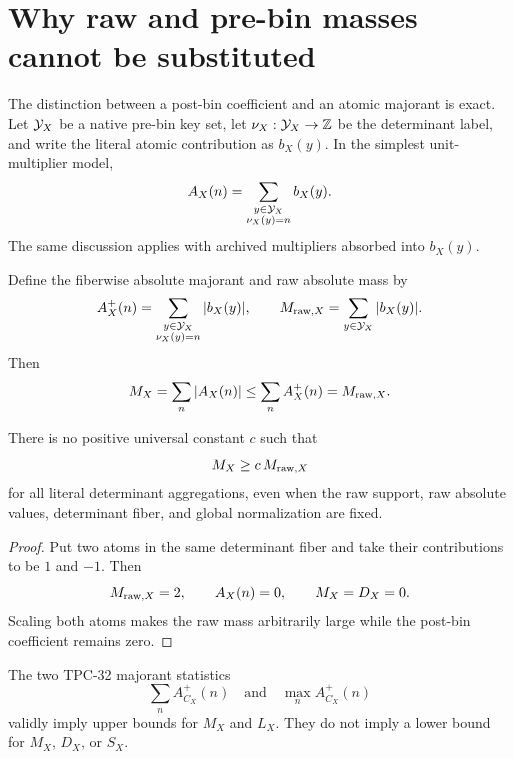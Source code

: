 \section{Why raw and pre-bin masses cannot be substituted}
\label{sec:non-substitution}

The distinction between a post-bin coefficient and an atomic
majorant is exact.  Let \(\mathcal Y_X\) be a native pre-bin key set, let
\(\nu_X:\mathcal Y_X\to\mathbb Z\) be the determinant label, and write the literal
atomic contribution as \(b_X(y)\).  In the simplest unit-multiplier
model,
\begin{equation}
 A_X(n)=
 \sum_{\substack{y\in\mathcal Y_X\\\nu_X(y)=n}}b_X(y).
\label{eq:atomic-binning}
\end{equation}
The same discussion applies with archived multipliers absorbed into
\(b_X(y)\).

Define the fiberwise absolute majorant and raw absolute mass by
\begin{equation}
 A_X^+(n)=
 \sum_{\substack{y\in\mathcal Y_X\\\nu_X(y)=n}}|b_X(y)|,
 \qquad
 M_{{\rm raw},X}=\sum_{y\in\mathcal Y_X}|b_X(y)|.
\label{eq:raw-majorant}
\end{equation}
Then
\begin{equation}
 M_X=\sum_n|A_X(n)|
 \le\sum_nA_X^+(n)
 =M_{{\rm raw},X}.
\label{eq:one-way-raw}
\end{equation}

\begin{proposition}
\label{prop:no-raw-reverse}
There is no positive universal constant \(c\) such that
\[
 M_X\ge c\,M_{{\rm raw},X}
\]
for all literal determinant aggregations, even when the raw support,
raw absolute values, determinant fiber, and global normalization are
fixed.
\end{proposition}

\begin{proof}
Put two atoms in the same determinant fiber and take their
contributions to be \(1\) and \(-1\).  Then
\[
 M_{{\rm raw},X}=2,\qquad A_X(n)=0,\qquad M_X=D_X=0.
\]
Scaling both atoms makes the raw mass arbitrarily large while the
post-bin coefficient remains zero.
\end{proof}

\begin{corollary}
\label{cor:majorant-upper-only}
The two TPC-32 majorant statistics
\[
 \sum_nA_{C_X}^+(n)
 \quad\text{and}\quad
 \max_nA_{C_X}^+(n)
\]
validly imply upper bounds for \(M_X\) and \(L_X\).  They do not
imply a lower bound for \(M_X\), \(D_X\), or \(S_X\).
\end{corollary}

